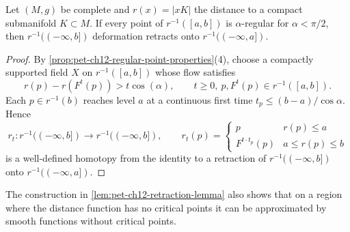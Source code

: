 \begin{lemma}
  \label{lem:pet-ch12-retraction-lemma}
  Let $(M,g)$ be complete and $r(x)=|xK|$ the distance to a compact submanifold
  $K\subset M$. If every point of $r^{-1}([a,b])$ is $\alpha$-regular for
  $\alpha<\pi/2$, then $r^{-1}((-\infty,b])$ deformation retracts onto
  $r^{-1}((-\infty,a])$.
\end{lemma}
\begin{proof}
  \sketch
  By \cref{prop:pet-ch12-regular-point-properties}(4), choose a compactly
  supported field $X$ on $r^{-1}([a,b])$ whose flow satisfies
  \[
    r(p)-r(F^t(p))>t\cos(\alpha),\qquad t\ge0,\ p,F^t(p)\in r^{-1}([a,b]).
  \]
  Each $p\in r^{-1}(b)$ reaches level $a$ at a continuous first time
  $t_p\le(b-a)/\cos\alpha$. Hence
  \[
    r_t:r^{-1}((-\infty,b])\to r^{-1}((-\infty,b]),\qquad
    r_t(p)=\begin{cases}p & r(p)\le a\\ F^{t\cdot t_p}(p) & a\le r(p)\le b\end{cases}
  \]
  is a well-defined homotopy from the identity to a retraction of
  $r^{-1}((-\infty,b])$ onto $r^{-1}((-\infty,a])$.
\end{proof}

\begin{remark}
  \label{rem:pet-ch12-retraction-remark}
  The construction in \cref{lem:pet-ch12-retraction-lemma} also shows that on a
  region where the
  distance function has no critical points it can be approximated by smooth
  functions without critical points.
\end{remark}

